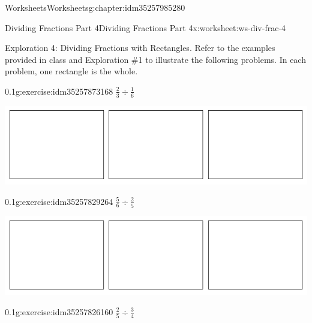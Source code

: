 \documentclass[twoside,11pt,]{book}
\begin{document}
\begin{chapterptx}{Worksheets}{}{Worksheets}{}{}{g:chapter:idm35257985280}
%
\begin{worksheet-section-numberless}{Dividing Fractions Part 4}{}{Dividing Fractions Part 4}{}{}{x:worksheet:ws-div-frac-4}
\begin{introduction}{}%
Exploration 4: Dividing Fractions with Rectangles.  Refer to the examples provided in class and Exploration \#1 to illustrate the following problems.  In each problem, one rectangle is the whole.%
\end{introduction}%
\begin{divisionexercise}{1}{}{0.1}{g:exercise:idm35257873168}%
\(\frac{2}{3} \div \frac{1}{6} \)%
\begin{sidebyside}{1}{0.1}{0.1}{0}%
\begin{sbspanel}{0.8}%
\includegraphics[width=1\linewidth]{images/3-rectangles.png}
\end{sbspanel}%
\end{sidebyside}%
\end{divisionexercise}%
\begin{divisionexercise}{2}{}{0.1}{g:exercise:idm35257829264}%
\(\frac{5}{6} \div \frac{2}{5} \)%
\begin{sidebyside}{1}{0.1}{0.1}{0}%
\begin{sbspanel}{0.8}%
\includegraphics[width=1\linewidth]{images/3-rectangles.png}
\end{sbspanel}%
\end{sidebyside}%
\end{divisionexercise}%
\begin{divisionexercise}{3}{}{0.1}{g:exercise:idm35257826160}%
\(\frac{2}{5} \div \frac{3}{4} \)%
\begin{sidebyside}{1}{0.1}{0.1}{0}%
\begin{sbspanel}{0.8}%

\end{sbspanel}
\end{sidebyside}
\end{divisionexercise}
\end{worksheet-section-numberless}
\end{chapterptx}
\end{document}
